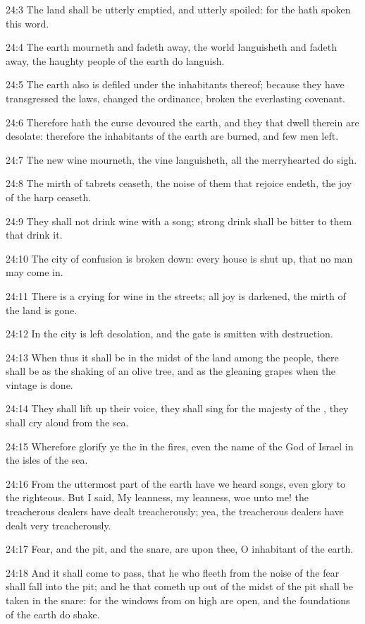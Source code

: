 24:3 The land shall be utterly emptied, and utterly spoiled: for the
\LORD hath spoken this word.

24:4 The earth mourneth and fadeth away, the world languisheth and
fadeth away, the haughty people of the earth do languish.

24:5 The earth also is defiled under the inhabitants thereof; because
they have transgressed the laws, changed the ordinance, broken the
everlasting covenant.

24:6 Therefore hath the curse devoured the earth, and they that dwell
therein are desolate: therefore the inhabitants of the earth are
burned, and few men left.

24:7 The new wine mourneth, the vine languisheth, all the merryhearted
do sigh.

24:8 The mirth of tabrets ceaseth, the noise of them that rejoice
endeth, the joy of the harp ceaseth.

24:9 They shall not drink wine with a song; strong drink shall be
bitter to them that drink it.

24:10 The city of confusion is broken down: every house is shut up,
that no man may come in.

24:11 There is a crying for wine in the streets; all joy is darkened,
the mirth of the land is gone.

24:12 In the city is left desolation, and the gate is smitten with
destruction.

24:13 When thus it shall be in the midst of the land among the people,
there shall be as the shaking of an olive tree, and as the gleaning
grapes when the vintage is done.

24:14 They shall lift up their voice, they shall sing for the majesty
of the \LORD, they shall cry aloud from the sea.

24:15 Wherefore glorify ye the \LORD in the fires, even the name of the
\LORD God of Israel in the isles of the sea.

24:16 From the uttermost part of the earth have we heard songs, even
glory to the righteous. But I said, My leanness, my leanness, woe unto
me! the treacherous dealers have dealt treacherously; yea, the
treacherous dealers have dealt very treacherously.

24:17 Fear, and the pit, and the snare, are upon thee, O inhabitant of
the earth.

24:18 And it shall come to pass, that he who fleeth from the noise of
the fear shall fall into the pit; and he that cometh up out of the
midst of the pit shall be taken in the snare: for the windows from on
high are open, and the foundations of the earth do shake.

